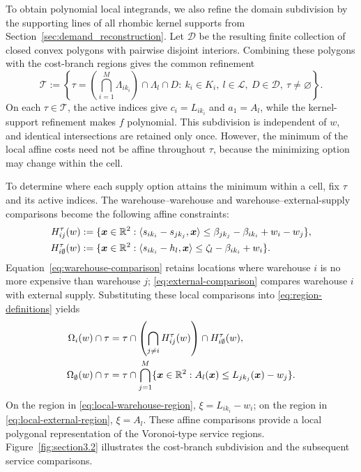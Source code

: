 \documentclass[a4paper,fleqn]{cas-sc}
\theoremstyle{remark}
\theoremstyle{plain}
\begin{document}
To obtain polynomial local integrands, we also refine the domain subdivision by the supporting lines of all rhombic kernel supports from Section~\ref{sec:demand_reconstruction}. Let $\mathcal D$ be the resulting finite collection of closed convex polygons with pairwise disjoint interiors. Combining these polygons with the cost-branch regions gives the common refinement
\begin{equation}\label{eq:common-refinement}
    \mathcal T:=\left\{\tau=\left(\bigcap_{i=1}^M\Lambda_{ik_i}\right)\cap\Lambda_l\cap D:\ k_i\in K_i,\ l\in\mathcal L,\ D\in\mathcal D,\ \tau\ne\varnothing\right\}.
\end{equation}
On each $\tau\in\mathcal T$, the active indices give $c_i=L_{ik_i}$ and $a_1=A_l$, while the kernel-support refinement makes $f$ polynomial. This subdivision is independent of $w$, and identical intersections are retained only once. However, the minimum of the local affine costs need not be affine throughout $\tau$, because the minimizing option may change within the cell.

To determine where each supply option attains the minimum within a cell, fix $\tau$ and its active indices. The warehouse--warehouse and warehouse--external-supply comparisons become the following affine constraints:
\begin{subequations}\label{eq:local-comparisons}
\allowdisplaybreaks[0]
\begin{align}
    H_{ij}^{\tau}(w)&:=\{\bm x\in\mathbb R^2:\langle s_{ik_i}-s_{jk_j},\bm x\rangle\le\beta_{jk_j}-\beta_{ik_i}+w_i-w_j\},\label{eq:warehouse-comparison}\\
    H_{i\emptyset}^{\tau}(w)&:=\{\bm x\in\mathbb R^2:\langle s_{ik_i}-h_l,\bm x\rangle\le\zeta_l-\beta_{ik_i}+w_i\}.\label{eq:external-comparison}
\end{align}
\end{subequations}
Equation~\eqref{eq:warehouse-comparison} retains locations where warehouse $i$ is no more expensive than warehouse $j$; \eqref{eq:external-comparison} compares warehouse $i$ with external supply. Substituting these local comparisons into \eqref{eq:region-definitions} yields
\begin{subequations}\label{eq:local-regions}
\allowdisplaybreaks[0]
\begin{align}
    \Omega_i(w)\cap\tau&=\tau\cap\left(\bigcap_{j\ne i}H_{ij}^{\tau}(w)\right)\cap H_{i\emptyset}^{\tau}(w),\label{eq:local-warehouse-region}\\
    \Omega_\emptyset(w)\cap\tau&=\tau\cap\bigcap_{j=1}^M\{\bm x\in\mathbb R^2:A_l(\bm x)\le L_{jk_j}(\bm x)-w_j\}.\label{eq:local-external-region}
\end{align}
\end{subequations}
On the region in \eqref{eq:local-warehouse-region}, $\xi=L_{ik_i}-w_i$; on the region in \eqref{eq:local-external-region}, $\xi=A_l$. These affine comparisons provide a local polygonal representation of the Voronoi-type service regions. Figure~\ref{fig:section3.2} illustrates the cost-branch subdivision and the subsequent service comparisons.
\end{document}
